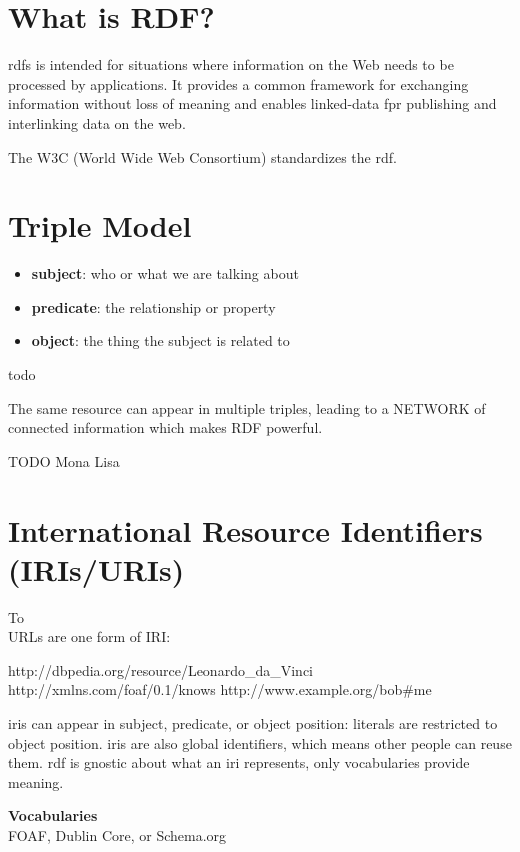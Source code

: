 
\section{What is RDF?}
\Glspl{rdf} is intended for situations where information on the Web needs to be
processed by applications.
It provides a common framework for exchanging information without loss of
meaning and enables \gls{linked-data} fpr publishing and interlinking data on the web.

The W3C (World Wide Web Consortium) standardizes the \gls{rdf}.

\section{Triple Model}
\begin{itemize}
    \item \textbf{subject}: who or what we are talking about
    \item \textbf{predicate}: the relationship or property
    \item \textbf{object}: the thing the subject is related to
\end{itemize}

\begin{bsp}
todo
\end{bsp}
The same resource can appear in multiple triples, leading to a  NETWORK of
connected information which makes RDF powerful.
\begin{bsp}
    TODO Mona Lisa
\end{bsp}

\section{International Resource Identifiers (IRIs/URIs)}

\begin{bsp} To  \\
URLs are one form of IRI:
\begin{verbatim*}
    http://dbpedia.org/resource/Leonardo_da_Vinci
    http://xmlns.com/foaf/0.1/knows
    http://www.example.org/bob#me
\end{verbatim*}
\end{bsp}
\Glspl{iri} can appear in subject, predicate, or object position: \glspl{literal} are restricted
to object position.
\Glspl{iri} are also global identifiers, which means other people can reuse them. \Gls{rdf} is gnostic about what an \gls{iri} represents, only vocabularies provide meaning.
\begin{bsp} \textbf{Vocabularies} \\
FOAF, Dublin Core, or Schema.org
\end{bsp}
